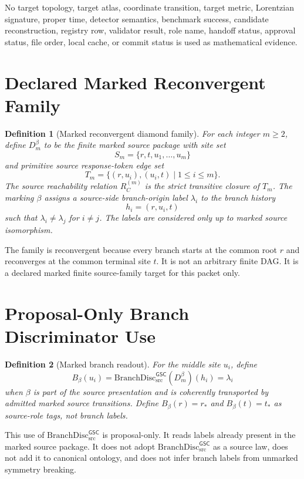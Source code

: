 \documentclass[11pt]{article}
\newcommand{\BranchDisc}{\mathrm{BranchDisc}_{\mathrm{src}}^{\mathsf{GSC}}}
\newcommand{\Dmbeta}{D_m^{\beta}}
\newtheorem{definition}{Definition}
\begin{document}
No target topology, target atlas, coordinate transition, target metric,
Lorentzian signature, proper time, detector semantics, benchmark success,
candidate reconstruction, registry row, validator result, role name, handoff
status, approval status, file order, local cache, or commit status is used as
mathematical evidence.

\section{Declared Marked Reconvergent Family}

\begin{definition}[Marked reconvergent diamond family]
For each integer \(m\ge 2\), define \(\Dmbeta\) to be the finite marked source
package with site set
\[
S_m=\{r,t,u_1,\ldots,u_m\}
\]
and primitive source response-token edge set
\[
T_m=\{(r,u_i),(u_i,t)\mid 1\le i\le m\}.
\]
The source reachability relation \(R_C^{(m)}\) is the strict transitive
closure of \(T_m\). The marking \(\beta\) assigns a source-side branch-origin
label \(\lambda_i\) to the branch history
\[
  h_i=(r,u_i,t)
\]
such that \(\lambda_i\ne\lambda_j\) for \(i\ne j\). The labels are considered
only up to marked source isomorphism.
\end{definition}

The family is reconvergent because every branch starts at the common root
\(r\) and reconverges at the common terminal site \(t\). It is not an arbitrary
finite DAG. It is a declared marked finite source-family target for this
packet only.

\section{Proposal-Only Branch Discriminator Use}

\begin{definition}[Marked branch readout]
For the middle site \(u_i\), define
\[
  B_\beta(u_i)=\BranchDisc(\Dmbeta)(h_i)=\lambda_i
\]
when \(\beta\) is part of the source presentation and is coherently
transported by admitted marked source transitions. Define \(B_\beta(r)=r_\ast\)
and \(B_\beta(t)=t_\ast\) as source-role tags, not branch labels.
\end{definition}

This use of \(\BranchDisc\) is proposal-only. It reads labels already present
in the marked source package. It does not adopt \(\BranchDisc\) as a source
law, does not add it to canonical ontology, and does not infer branch labels
from unmarked symmetry breaking.
\end{document}
